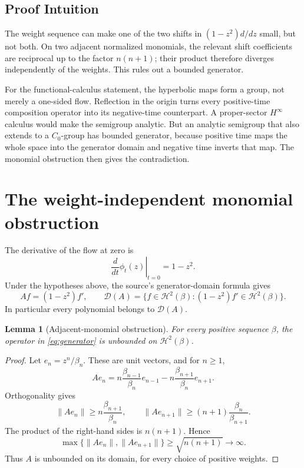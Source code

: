 \documentclass[10pt]{article}
\newtheorem{lemma}[theorem]{Lemma}
\newcommand{\Hbeta}{\mathcal H^2(\beta)}
\newcommand{\Dom}{\mathcal D}
\begin{document}
\subsection*{Proof Intuition}

The weight sequence can make one of the two shifts in
$(1-z^2)d/dz$ small, but not both.  On two adjacent normalized monomials,
the relevant shift coefficients are reciprocal up to the factor $n(n+1)$;
their product therefore diverges independently of the weights.  This rules
out a bounded generator.

For the functional-calculus statement, the hyperbolic maps form a group, not
merely a one-sided flow.  Reflection in the origin turns every positive-time
composition operator into its negative-time counterpart.  A proper-sector
$H^\infty$ calculus would make the semigroup analytic.  But an analytic
semigroup that also extends to a $C_0$-group has bounded generator, because
positive time maps the whole space into the generator domain and negative
time inverts that map.  The monomial obstruction then gives the contradiction.

\section{The weight-independent monomial obstruction}

The derivative of the flow at zero is
\[
 \left.\frac{d}{dt}\phi_t(z)\right|_{t=0}=1-z^2.
\]
Under the hypotheses above, the source's generator-domain formula gives
\begin{equation}\label{eq:generator}
 Af=(1-z^2)f',\qquad
 \Dom(A)=\{f\in\Hbeta:(1-z^2)f'\in\Hbeta\}.
\end{equation}
In particular every polynomial belongs to $\Dom(A)$.

\begin{lemma}[Adjacent-monomial obstruction]\label{lem:unbounded}
For every positive sequence $\beta$, the operator in
\eqref{eq:generator} is unbounded on $\Hbeta$.
\end{lemma}

\begin{proof}
Let $e_n=z^n/\beta_n$.  These are unit vectors, and for $n\geq1$,
\begin{equation}\label{eq:matrix}
 Ae_n=n\frac{\beta_{n-1}}{\beta_n}e_{n-1}
      -n\frac{\beta_{n+1}}{\beta_n}e_{n+1}.
\end{equation}
Orthogonality gives
\[
 \|Ae_n\|\geq n\frac{\beta_{n+1}}{\beta_n},\qquad
 \|Ae_{n+1}\|\geq(n+1)\frac{\beta_n}{\beta_{n+1}}.
\]
The product of the right-hand sides is $n(n+1)$.  Hence
\begin{equation}\label{eq:lower}
 \max\{\|Ae_n\|,\|Ae_{n+1}\|\}\geq\sqrt{n(n+1)}
 \longrightarrow\infty.
\end{equation}
Thus $A$ is unbounded on its domain, for every choice of positive weights.
\end{proof}
\end{document}
